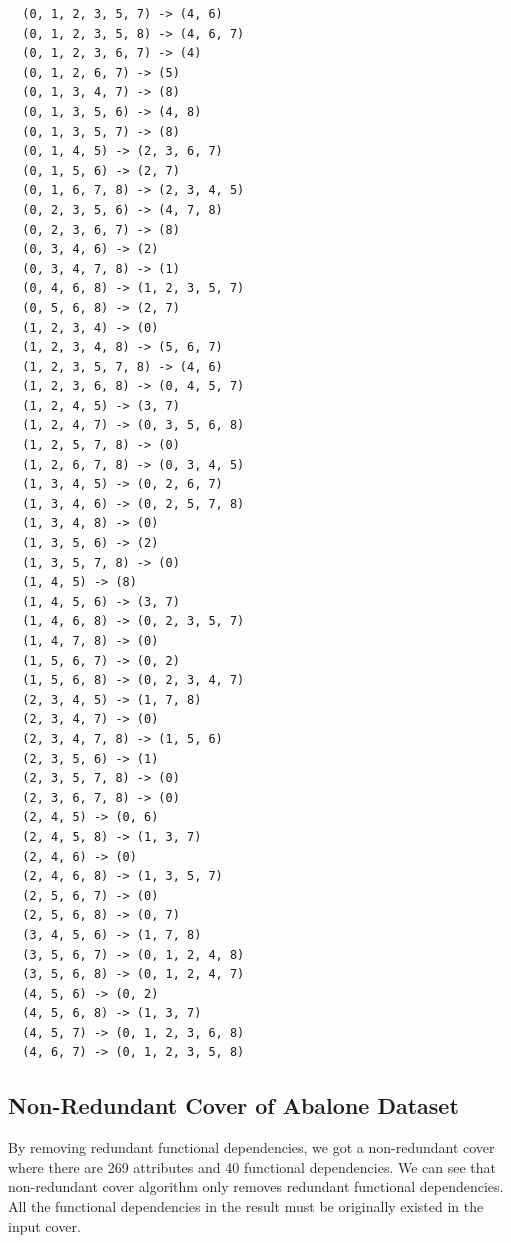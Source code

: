 \documentclass[11pt]{book}
\begin{document}
\begin{verbatim}
  (0, 1, 2, 3, 5, 7) -> (4, 6)
  (0, 1, 2, 3, 5, 8) -> (4, 6, 7)
  (0, 1, 2, 3, 6, 7) -> (4)
  (0, 1, 2, 6, 7) -> (5)
  (0, 1, 3, 4, 7) -> (8)
  (0, 1, 3, 5, 6) -> (4, 8)
  (0, 1, 3, 5, 7) -> (8)
  (0, 1, 4, 5) -> (2, 3, 6, 7)
  (0, 1, 5, 6) -> (2, 7)
  (0, 1, 6, 7, 8) -> (2, 3, 4, 5)
  (0, 2, 3, 5, 6) -> (4, 7, 8)
  (0, 2, 3, 6, 7) -> (8)
  (0, 3, 4, 6) -> (2)
  (0, 3, 4, 7, 8) -> (1)
  (0, 4, 6, 8) -> (1, 2, 3, 5, 7)
  (0, 5, 6, 8) -> (2, 7)
  (1, 2, 3, 4) -> (0)
  (1, 2, 3, 4, 8) -> (5, 6, 7)
  (1, 2, 3, 5, 7, 8) -> (4, 6)
  (1, 2, 3, 6, 8) -> (0, 4, 5, 7)
  (1, 2, 4, 5) -> (3, 7)
  (1, 2, 4, 7) -> (0, 3, 5, 6, 8)
  (1, 2, 5, 7, 8) -> (0)
  (1, 2, 6, 7, 8) -> (0, 3, 4, 5)
  (1, 3, 4, 5) -> (0, 2, 6, 7)
  (1, 3, 4, 6) -> (0, 2, 5, 7, 8)
  (1, 3, 4, 8) -> (0)
  (1, 3, 5, 6) -> (2)
  (1, 3, 5, 7, 8) -> (0)
  (1, 4, 5) -> (8)
  (1, 4, 5, 6) -> (3, 7)
  (1, 4, 6, 8) -> (0, 2, 3, 5, 7)
  (1, 4, 7, 8) -> (0)
  (1, 5, 6, 7) -> (0, 2)
  (1, 5, 6, 8) -> (0, 2, 3, 4, 7)
  (2, 3, 4, 5) -> (1, 7, 8)
  (2, 3, 4, 7) -> (0)
  (2, 3, 4, 7, 8) -> (1, 5, 6)
  (2, 3, 5, 6) -> (1)
  (2, 3, 5, 7, 8) -> (0)
  (2, 3, 6, 7, 8) -> (0)
  (2, 4, 5) -> (0, 6)
  (2, 4, 5, 8) -> (1, 3, 7)
  (2, 4, 6) -> (0)
  (2, 4, 6, 8) -> (1, 3, 5, 7)
  (2, 5, 6, 7) -> (0)
  (2, 5, 6, 8) -> (0, 7)
  (3, 4, 5, 6) -> (1, 7, 8)
  (3, 5, 6, 7) -> (0, 1, 2, 4, 8)
  (3, 5, 6, 8) -> (0, 1, 2, 4, 7)
  (4, 5, 6) -> (0, 2)
  (4, 5, 6, 8) -> (1, 3, 7)
  (4, 5, 7) -> (0, 1, 2, 3, 6, 8)
  (4, 6, 7) -> (0, 1, 2, 3, 5, 8)
\end{verbatim}

\subsection{Non-Redundant Cover of Abalone Dataset}

By removing redundant functional dependencies, we got a non-redundant cover where there are 269 attributes and 40 functional dependencies. We can see that non-redundant cover algorithm only removes redundant functional dependencies. All the functional dependencies in the result must be originally existed in the input cover.
\end{document}
